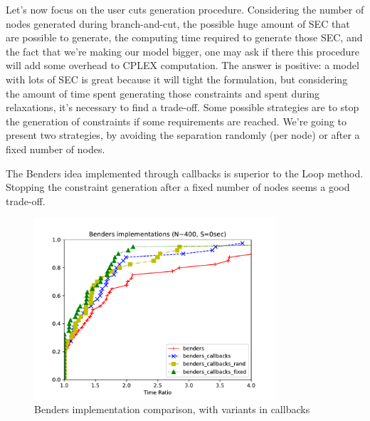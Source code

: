 Let's now focus on the user cuts generation procedure. Considering the number of
nodes generated during branch-and-cut, the possible huge amount of SEC that are
possible to generate, the computing time required to generate those SEC, and the
fact that we're making our model bigger, one may ask if there this procedure
will add some overhead to CPLEX computation. The answer is positive: a model
with lots of SEC is great because it will tight the formulation, but considering
the amount of time spent generating those constraints and spent during
relaxations, it's necessary to find a trade-off. Some possible strategies are to
stop the generation of constraints if some requirements are reached. We're going
to present two strategies, by avoiding the separation randomly (per node) or
after a fixed number of nodes.
\newpage

\begin{claim}
    The Benders idea implemented through callbacks is superior to the Loop
    method. Stopping the constraint generation after a fixed number of nodes seems
    a good trade-off.
\end{claim}

\begin{figure}[h]
    \centering
    \includegraphics[width=0.8\textwidth]{figures/benders_final}
    \caption{Benders implementation comparison, with variants in callbacks}
\end{figure}

